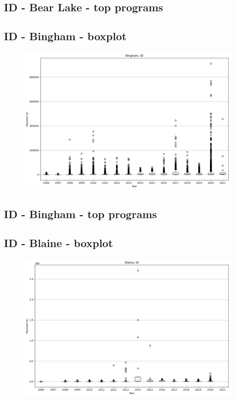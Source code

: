\subsection*{ID - Bear Lake - top programs}

\newpage
\subsection*{ID - Bingham - boxplot}
\begin{figure}[h]
\centering
\includegraphics[width=7in]{../output/boxplots/counties/Bingham-ID_boxplot.png}
\end{figure}


\subsection*{ID - Bingham - top programs}

\newpage
\subsection*{ID - Blaine - boxplot}
\begin{figure}[h]
\centering
\includegraphics[width=7in]{../output/boxplots/counties/Blaine-ID_boxplot.png}
\end{figure}



